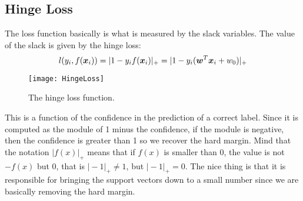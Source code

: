 \subsection{Hinge Loss}
The loss function basically is what is measured by the slack variables. The value of the slack is given by the hinge loss: 
\begin{equation}
  l(y_i, f(\bm{x}_i))=\vert1-y_if(\bm{x}_i)\vert_+=\vert1-y_i(\bm{w}^T\bm{x}_i+w_0)\vert_+
  \label{eq:HingeLoss}
\end{equation}
\begin{figure}
  \centering
  \texttt{[image: HingeLoss]}
  \caption{The hinge loss function.}
  \label{fig:hingeLoss}
\end{figure}
This is a function of the confidence in the prediction of a correct label. \newline
Since it is computed as the module of 1 minus the confidence, if the module is negative, then the confidence is greater than 1 so we recover the hard margin. \newline
Mind that the notation $\vert f(x)\vert_+$ means that if $f(x)$ is smaller than 0, the value is not $-f(x)$ but $0$, that is $\vert -1\vert_+\neq 1$, but $\vert-1\vert_+=0$. \newline
The nice thing is that it is responsible for bringing the support vectors down to a small number since we are basically removing the hard margin.
%
%
